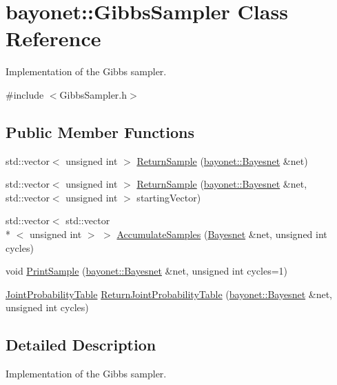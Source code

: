 \hypertarget{classbayonet_1_1_gibbs_sampler}{\section{bayonet\-:\-:Gibbs\-Sampler Class Reference}
\label{classbayonet_1_1_gibbs_sampler}
}


Implementation of the Gibbs sampler.  




{\ttfamily \#include $<$Gibbs\-Sampler.\-h$>$}

\subsection*{Public Member Functions}
\begin{DoxyCompactItemize}
\item 
std\-::vector$<$ unsigned int $>$ \hyperlink{classbayonet_1_1_gibbs_sampler_ac789fc64fd349769633ab84ea5e59f70}{Return\-Sample} (\hyperlink{classbayonet_1_1_bayesnet}{bayonet\-::\-Bayesnet} \&net)
\item 
std\-::vector$<$ unsigned int $>$ \hyperlink{classbayonet_1_1_gibbs_sampler_aa3e7d24f8eae4ee4c4ed0a2c16a9b5fa}{Return\-Sample} (\hyperlink{classbayonet_1_1_bayesnet}{bayonet\-::\-Bayesnet} \&net, std\-::vector$<$ unsigned int $>$ starting\-Vector)
\item 
std\-::vector$<$ std\-::vector\\*
$<$ unsigned int $>$ $>$ \hyperlink{classbayonet_1_1_gibbs_sampler_a625b16c10dc1d4fea3899fd5a0b3c921}{Accumulate\-Samples} (\hyperlink{classbayonet_1_1_bayesnet}{Bayesnet} \&net, unsigned int cycles)
\item 
void \hyperlink{classbayonet_1_1_gibbs_sampler_af375d044a2e0c45a384f37ee4761a2ba}{Print\-Sample} (\hyperlink{classbayonet_1_1_bayesnet}{bayonet\-::\-Bayesnet} \&net, unsigned int cycles=1)
\item 
\hyperlink{classbayonet_1_1_joint_probability_table}{Joint\-Probability\-Table} \hyperlink{classbayonet_1_1_gibbs_sampler_a29dfcfda3462de83fa89672768d690f4}{Return\-Joint\-Probability\-Table} (\hyperlink{classbayonet_1_1_bayesnet}{bayonet\-::\-Bayesnet} \&net, unsigned int cycles)
\end{DoxyCompactItemize}


\subsection{Detailed Description}
Implementation of the Gibbs sampler. 

